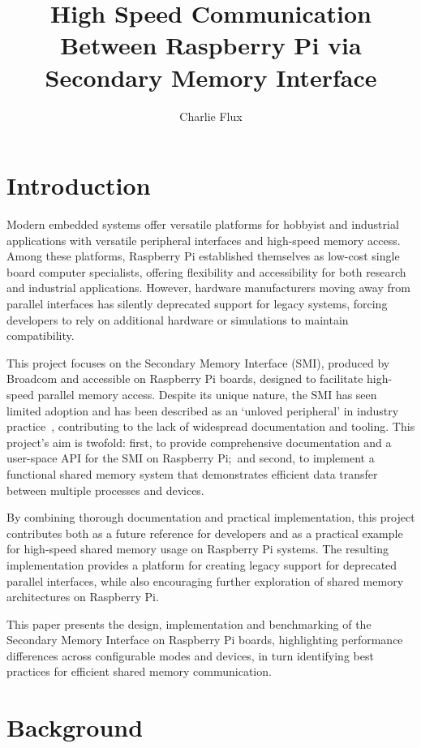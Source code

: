 \documentclass[final]{cmpreport}
\title{High Speed Communication Between Raspberry Pi via Secondary Memory Interface}
\author{Charlie Flux}
\begin{document}
\section{Introduction}
Modern embedded systems offer versatile platforms for hobbyist and industrial applications with versatile peripheral interfaces and high-speed memory access. Among these platforms, Raspberry Pi established themselves as low-cost single board computer specialists, offering flexibility and accessibility for both research and industrial applications. However, hardware manufacturers moving away from parallel interfaces has silently deprecated support for legacy systems, forcing developers to rely on additional hardware or simulations to maintain compatibility. 

This project focuses on the Secondary Memory Interface (SMI), produced by Broadcom and accessible on Raspberry Pi boards, designed to facilitate high-speed parallel memory access. Despite its unique nature, the SMI has seen limited adoption and has been described as an `unloved peripheral' in industry practice~\cite{zotero-item-18}, contributing to the lack of widespread documentation and tooling. This project's aim is twofold: first, to provide comprehensive documentation and a user-space API for the SMI on Raspberry Pi;~and second, to implement a functional shared memory system that demonstrates efficient data transfer between multiple processes and devices.

By combining thorough documentation and practical implementation, this project contributes both as a future reference for developers and as a practical example for high-speed shared memory usage on Raspberry Pi systems. The resulting implementation provides a platform for creating legacy support for deprecated parallel interfaces, while also encouraging further exploration of shared memory architectures on Raspberry Pi.

This paper presents the design, implementation and benchmarking of the Secondary Memory Interface on Raspberry Pi boards, highlighting performance differences across configurable modes and devices, in turn identifying best practices for efficient shared memory communication.

\section{Background}
\end{document}
